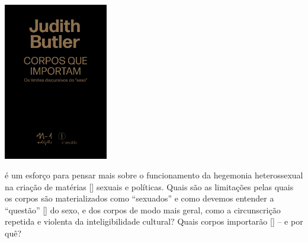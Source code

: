 \pagebreak

\hspace{.5cm}

\begin{center}
\hspace*{-4.5cm}
\hspace*{4cm}\includegraphics[width=45.6mm]{./imgs/butler.jpg}
\end{center}

\hspace*{-7cm}\hrulefill\hspace*{-7cm}

\medskip

 é um esforço para pensar mais sobre o funcionamento da hegemonia heterossexual na criação de matérias [{}] sexuais e políticas. Quais são as limitações pelas quais os corpos são materializados como “sexuados” e como devemos entender a “questão” [{}] do sexo, e dos corpos de modo mais geral, como a circunscrição repetida e violenta da inteligibilidade cultural? Quais corpos importarão [{}] – e por quê?

\vfill

\hspace*{-.4cm}\begin{minipage}[c]{1\linewidth}
\small{
{}}
\end{minipage}

